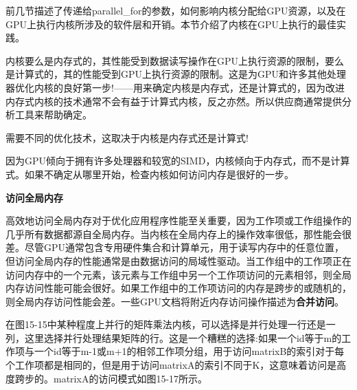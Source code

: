 前几节描述了传递给parallel\_for的参数，如何影响内核分配给GPU资源，以及在GPU上执行内核所涉及的软件层和开销。本节介绍了内核在GPU上执行的最佳实践。\par

内核要么是内存式的，其性能受到数据读写操作在GPU上执行资源的限制，要么是计算式的，其的性能受到GPU上执行资源的限制。这是为GPU和许多其他处理器优化内核的良好第一步!——用来确定内核是内存式，还是计算式的，因为改进内存式内核的技术通常不会有益于计算式内核，反之亦然。所以供应商通常提供分析工具来帮助确定。\par

\begin{tcolorbox}[colback=red!5!white,colframe=red!75!black]
需要不同的优化技术，这取决于内核是内存式还是计算式!
\end{tcolorbox}

因为GPU倾向于拥有许多处理器和较宽的SIMD，内核倾向于内存式，而不是计算式。如果不确定从哪里开始，检查内核如何访问内存是很好的一步。\par

\hspace*{\fill} \par %
\textbf{访问全局内存}

高效地访问全局内存对于优化应用程序性能至关重要，因为工作项或工作组操作的几乎所有数据都源自全局内存。当内核在全局内存上的操作效率很低，那性能会很差。尽管GPU通常包含专用硬件集合和计算单元，用于读写内存中的任意位置，但访问全局内存的性能通常是由数据访问的局域性驱动。当工作组中的工作项正在访问内存中的一个元素，该元素与工作组中另一个工作项访问的元素相邻，则全局内存访问性能可能会很好。如果工作组中的工作项访问的内存是跨步的或随机的，则全局内存访问性能会差。一些GPU文档将附近内存访问操作描述为\textbf{合并访问}。\par

在图15-15中某种程度上并行的矩阵乘法内核，可以选择是并行处理一行还是一列，这里选择并行处理结果矩阵的行。这是一个糟糕的选择:如果一个id等于m的工作项与一个id等于m-1或m+1的相邻工作项分组，用于访问matrixB的索引对于每个工作项都是相同的，但是用于访问matrixA的索引不同于K，这意味着访问是高度跨步的。matrixA的访问模式如图15-17所示。\par

